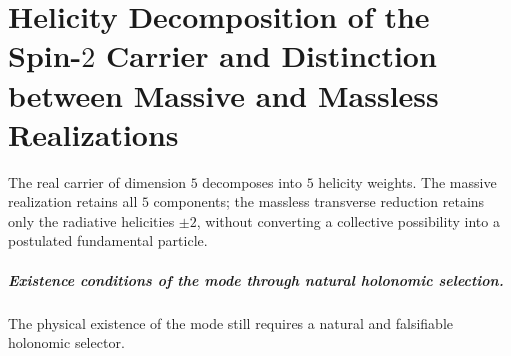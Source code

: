 \chapter{Helicity Decomposition of the Spin-\texorpdfstring{\(2\)}{2} Carrier and Distinction between Massive and Massless Realizations}
\label{chap:parte-iv-65}

The real carrier of dimension \(5\) decomposes into \(5\)
helicity weights. The massive realization retains all
\(5\) components; the massless transverse reduction retains only the
radiative helicities \(\pm2\), without converting a collective
possibility into a postulated fundamental particle.



\paragraph{Existence conditions of the mode through natural holonomic selection.} The physical existence of the mode still requires a natural and falsifiable holonomic selector.
